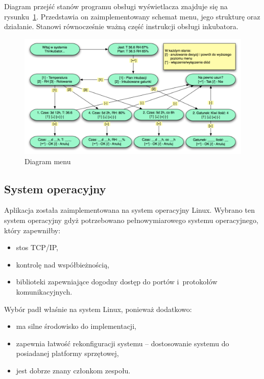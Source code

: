 Diagram przejść stanów programu obsługi wyświetlacza znajduje się na
rysunku~\ref{rys:Menu}. Przedstawia on zaimplementowany schemat menu, jego
strukturę oraz działanie. Stanowi równocześnie ważną część instrukcji obsługi
inkubatora.


\begin{figure}[b] 
\centering\includegraphics[width=\textwidth]{figures/Menu}
\caption{Diagram menu}\label{rys:Menu}
\end{figure}

\subsection{System operacyjny}
Aplikacja została zaimplementowana na system operacyjny Linux. Wybrano ten
system operacyjny gdyż potrzebowano pełnowymiarowego systemu operacyjnego, który
zapewniłby:
\begin{itemize}
 \item stos TCP/IP,
 \item kontrolę nad współbieżnością,
 \item biblioteki zapewniające dogodny dostęp do portów i~protokołów komunikacyjnych.
\end{itemize}
Wybór padł właśnie na system Linux, ponieważ dodatkowo:
\begin{itemize}
 \item ma silne środowisko do implementacji,
 \item zapewnia łatwość rekonfiguracji systemu -- dostosowanie systemu do posiadanej platformy sprzętowej,
 \item jest dobrze znany członkom zespołu.
\end{itemize}

